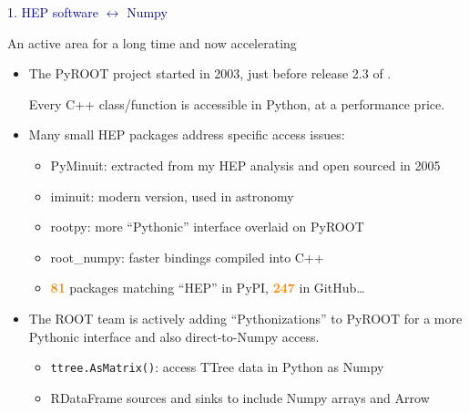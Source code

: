 \documentclass[aspectratio=169]{beamer}
\begin{document}
\begin{frame}{}
\LARGE
\vspace{1 cm}
\begin{center}
\textcolor{darkblue}{1. HEP software $\leftrightarrow$ Numpy}
\end{center}
\end{frame}

\begin{frame}{An active area for a long time and now accelerating}
\vspace{0.5 cm}
\begin{itemize}\setlength{\itemsep}{0.5 cm}
\item The PyROOT project started in 2003, just before release 2.3 of .

Every C++ class/function is accessible in Python, at a performance price.

\item Many small HEP packages address specific access issues:

\vspace{0.05 cm}
\begin{itemize}\setlength{\itemsep}{0.05 cm}
\item PyMinuit: extracted from my HEP analysis and open sourced in 2005
\item iminuit: modern version, used in astronomy
\item rootpy: more ``Pythonic'' interface overlaid on PyROOT
\item root\_numpy: faster bindings compiled into C++
\item \textcolor{darkorange}{\bf 81} packages matching ``HEP'' in PyPI, \textcolor{darkorange}{\bf 247} in GitHub\ldots
\end{itemize}

\item The ROOT team is actively adding ``Pythonizations'' to PyROOT for a more Pythonic interface and also direct-to-Numpy access.

\vspace{0.1 cm}
\begin{itemize}\setlength{\itemsep}{0.1 cm}
\item {\tt\small ttree.AsMatrix()}: access TTree data in Python as Numpy
\item RDataFrame sources and sinks to include Numpy arrays and Arrow
\end{itemize}
\end{itemize}
\end{frame}
\end{document}
